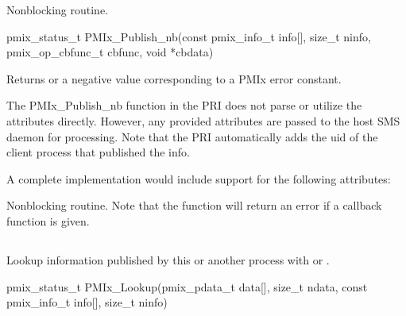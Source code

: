 \summary

Nonblocking  routine.

\format

\cspecificstart
\begin{codepar}
pmix_status_t
PMIx_Publish_nb(const pmix_info_t info[], size_t ninfo,
                pmix_op_cbfunc_t cbfunc, void *cbdata)
\end{codepar}
\cspecificend

\begin{arglist}
\end{arglist}

Returns  or a negative value corresponding to a PMIx error constant.

\priattr
The PMIx_Publish_nb function in the \ac{PRI} does not parse or utilize the attributes directly. However, any provided attributes are passed to the host \ac{SMS} daemon for processing. Note that the \ac{PRI} automatically adds the uid of the client process that published the info.

\optattr
A complete implementation would include support for the following attributes:


\descr

Nonblocking  routine.
Note that the function will return an error if a  callback function is given.


\subsection{}

\summary

Lookup information published by this or another process with  or .

\format

\cspecificstart
\begin{codepar}
pmix_status_t
PMIx_Lookup(pmix_pdata_t data[], size_t ndata,
            const pmix_info_t info[], size_t ninfo)
\end{codepar}
\cspecificend

